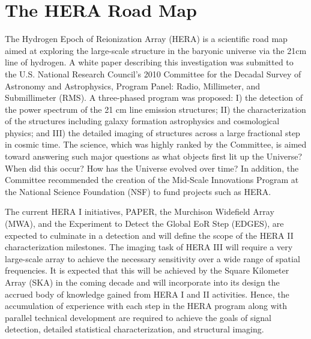 \section{The HERA Road Map}
The Hydrogen Epoch of Reionization Array (HERA) is a scientific road
map aimed at exploring the large-scale structure in the baryonic
universe via the 21cm line of hydrogen.  A white paper describing this
investigation was submitted to the U.S. National Research Council's
2010 Committee for the Decadal Survey of Astronomy and Astrophysics,
Program Panel: Radio, Millimeter, and Submillimeter (RMS).  A
three-phased program was proposed: I) the detection of the power
spectrum of the 21 cm line emission structures; II) the
characterization of the structures including galaxy formation
astrophysics and cosmological physics; and III) the detailed imaging
of structures across a large fractional step in cosmic time. The
science, which was highly ranked by the Committee, is aimed toward
answering such major questions as what objects first lit up the
Universe? When did this occur? How has the Universe evolved over time?
In addition, the Committee recommended the creation of the Mid-Scale
Innovations Program at the National Science Foundation (NSF) to fund
projects such as HERA.

The current HERA I initiatives, PAPER, the Murchison Widefield Array
(MWA), and the Experiment to Detect the Global EoR Step (EDGES), are
expected to culminate in a detection and will define the scope of the
HERA II characterization milestones.  The imaging task of HERA III
will require a very large-scale array to achieve the necessary
sensitivity over a wide range of spatial frequencies. It is expected
that this will be achieved by the Square Kilometer Array (SKA) in the
coming decade and will incorporate into its design the accrued body of
knowledge gained from HERA I and II activities.  Hence, the
accumulation of experience with each step in the HERA program along
with parallel technical development are required to achieve the goals
of signal detection, detailed statistical characterization, and
structural imaging.


